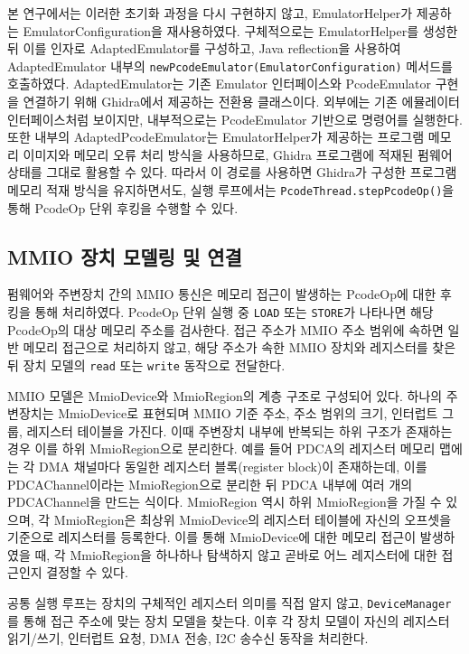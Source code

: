 \documentclass[master,korean,final]{kaist-ucs}
\begin{document}
본 연구에서는 이러한 초기화 과정을 다시 구현하지 않고, EmulatorHelper가 제공하는 EmulatorConfiguration을 재사용하였다. 구체적으로는 EmulatorHelper를 생성한 뒤 이를 인자로 AdaptedEmulator를 구성하고, Java reflection을 사용하여 AdaptedEmulator 내부의 \texttt{newPcodeEmulator(EmulatorConfiguration)} 메서드를 호출하였다. AdaptedEmulator는 기존 Emulator 인터페이스와 PcodeEmulator 구현을 연결하기 위해 Ghidra에서 제공하는 전환용 클래스이다. 외부에는 기존 에뮬레이터 인터페이스처럼 보이지만, 내부적으로는 PcodeEmulator 기반으로 명령어를 실행한다. 또한 내부의 AdaptedPcodeEmulator는 EmulatorHelper가 제공하는 프로그램 메모리 이미지와 메모리 오류 처리 방식을 사용하므로, Ghidra 프로그램에 적재된 펌웨어 상태를 그대로 활용할 수 있다. 따라서 이 경로를 사용하면 Ghidra가 구성한 프로그램 메모리 적재 방식을 유지하면서도, 실행 루프에서는 \texttt{PcodeThread.stepPcodeOp()}을 통해 PcodeOp 단위 후킹을 수행할 수 있다.

\subsection{MMIO 장치 모델링 및 연결}

펌웨어와 주변장치 간의 MMIO 통신은 메모리 접근이 발생하는 PcodeOp에 대한 후킹을 통해 처리하였다. PcodeOp 단위 실행 중 \texttt{LOAD} 또는 \texttt{STORE}가 나타나면 해당 PcodeOp의 대상 메모리 주소를 검사한다. 접근 주소가 MMIO 주소 범위에 속하면 일반 메모리 접근으로 처리하지 않고, 해당 주소가 속한 MMIO 장치와 레지스터를 찾은 뒤 장치 모델의 \texttt{read} 또는 \texttt{write} 동작으로 전달한다.

MMIO 모델은 MmioDevice와 MmioRegion의 계층 구조로 구성되어 있다. 하나의 주변장치는 MmioDevice로 표현되며 MMIO 기준 주소, 주소 범위의 크기, 인터럽트 그룹, 레지스터 테이블을 가진다. 이때 주변장치 내부에 반복되는 하위 구조가 존재하는 경우 이를 하위 MmioRegion으로 분리한다. 예를 들어 PDCA의 레지스터 메모리 맵에는 각 DMA 채널마다 동일한 레지스터 블록(register block)이 존재하는데, 이를 PDCAChannel이라는 MmioRegion으로 분리한 뒤 PDCA 내부에 여러 개의 PDCAChannel을 만드는 식이다. MmioRegion 역시 하위 MmioRegion을 가질 수 있으며, 각 MmioRegion은 최상위 MmioDevice의 레지스터 테이블에 자신의 오프셋을 기준으로 레지스터를 등록한다. 이를 통해 MmioDevice에 대한 메모리 접근이 발생하였을 때, 각 MmioRegion을 하나하나 탐색하지 않고 곧바로 어느 레지스터에 대한 접근인지 결정할 수 있다.

공통 실행 루프는 장치의 구체적인 레지스터 의미를 직접 알지 않고, \texttt{DeviceManager}를 통해 접근 주소에 맞는 장치 모델을 찾는다. 이후 각 장치 모델이 자신의 레지스터 읽기/쓰기, 인터럽트 요청, DMA 전송, I2C 송수신 동작을 처리한다.
\end{document}
